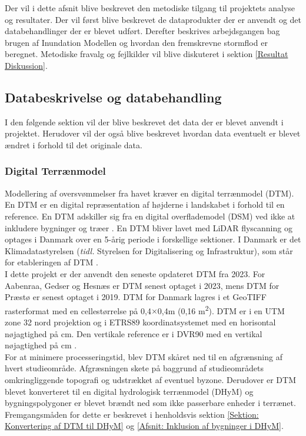 Der vil i dette afsnit blive beskrevet den metodiske tilgang til projektets analyse og resultater. Der vil først blive beskrevet de dataprodukter der er anvendt og det databehandlinger der er blevet udført. Derefter beskrives arbejdsgangen bag brugen af Inundation Modellen og hvordan den fremskrevne stormflod er beregnet. Metodiske fravalg og fejlkilder vil blive diskuteret i sektion \ref{Resultat Diskussion}. 

\subsection{Databeskrivelse og databehandling} \label{Sektion: Databeskrivelse}


I den følgende sektion vil der blive beskrevet det data der er blevet anvendt i projektet. Herudover vil der også blive beskrevet hvordan data eventuelt er blevet ændret i forhold til det originale data. 

\subsubsection{Digital Terrænmodel} \label{Afsnit: Digital Terræn Model}
Modellering af oversvømmelser fra havet kræver en digital terrænmodel (DTM). En DTM er en digital repræsentation af højderne i landskabet i forhold til en reference. En DTM adskiller sig fra en digital overflademodel (DSM) ved ikke at inkludere bygninger og træer \citep{sdfe_dhm_2020}. En DTM bliver lavet med LiDAR flyscanning og optages i Danmark over en 5-årig periode i forskellige sektioner. 
I Danmark er det Klimadatastyrelsen (\textit{tidl.} Styrelsen for Digitalisering og Infrastruktur), som står for etableringen af DTM \citep{sdfe_dhm_2020}. \\

I dette projekt er der anvendt den seneste opdateret DTM fra 2023. For Aabenraa, Gedser og Hesnæs er DTM senest optaget i 2023, mens DTM for Præstø er senest optaget i 2019. DTM for Danmark lagres i et GeoTIFF rasterformat med en cellestørrelse på 0,4$\times$0,4m (0,16 m\textsuperscript{2}). DTM er i en UTM zone 32 nord projektion og i ETRS89 koordinatsystemet med en horisontal nøjagtighed på  cm. Den vertikale reference er i DVR90 med en vertikal nøjagtighed på  cm \citep{sdfe_dhm_2020}. \\
For at minimere processeringstid, blev DTM skåret ned til en afgrænsning af hvert studieområde. Afgræsningen skete på baggrund af studieområdets omkringliggende topografi og udstrækket af eventuel byzone. Derudover er DTM blevet konverteret til en digital hydrologisk terrænmodel (DHyM) og bygningspolygoner er blevet brændt ned som ikke passerbare enheder i terrænet. Fremgangsmåden for dette er beskrevet i henholdsvis sektion \ref{Sektion: Konvertering af DTM til DHyM} og \ref{Afsnit: Inklusion af bygninger i DHyM}.


